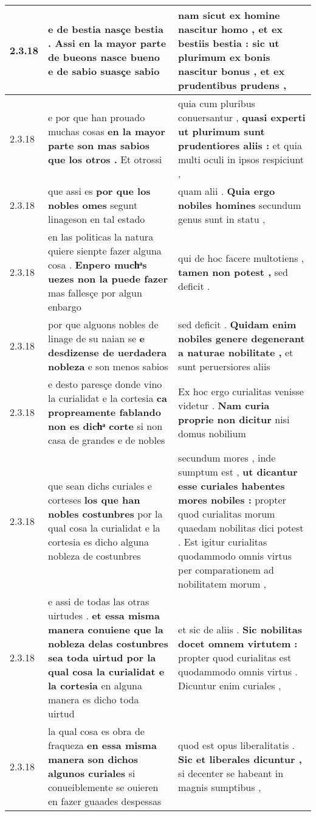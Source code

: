 \begin{tabular}{|p{1cm}|p{6.5cm}|p{6.5cm}|}
2.3.18 & e de bestia nasçe bestia . \textbf{ Assi en la mayor parte de bueons nasce bueno } e de sabio suasçe sabio & nam sicut ex homine nascitur homo , et ex bestiis bestia : \textbf{ sic ut plurimum ex bonis nascitur bonus , } et ex prudentibus prudens , \\\hline
2.3.18 & e por que han prouado muchas cosas \textbf{ en la mayor parte son mas sabios que los otros . } Et otrossi & quia cum pluribus conuersantur , \textbf{ quasi experti ut plurimum sunt prudentiores aliis : } et quia multi oculi in ipsos respiciunt , \\\hline
2.3.18 & que assi es \textbf{ por que los nobles omes } segunt linageson en tal estado & quam alii . \textbf{ Quia ergo nobiles homines } secundum genus sunt in statu , \\\hline
2.3.18 & en las politicas la natura quiere sienpte fazer alguna cosa . \textbf{ Enpero muchͣs uezes non la puede fazer } mas fallesçe por algun enbargo & qui de hoc facere multotiens , \textbf{ tamen non potest , } sed deficit . \\\hline
2.3.18 & por que alguons nobles de linage de su naian se \textbf{ e desdizense de uerdadera nobleza } e son menos sabios & sed deficit . \textbf{ Quidam enim nobiles genere degenerant a naturae nobilitate , } et sunt peruersiores aliis \\\hline
2.3.18 & e desto paresçe donde vino la curialidat e la cortesia \textbf{ ca propreamente fablando non es dichͣ corte } si non casa de grandes e de nobles & Ex hoc ergo curialitas venisse videtur . \textbf{ Nam curia proprie non dicitur } nisi domus nobilium \\\hline
2.3.18 & que sean dichs curiales e corteses \textbf{ los que han nobles costunbres } por la qual cosa la curialidat e la cortesia es dicho alguna nobleza de costunbres & secundum mores , inde sumptum est , \textbf{ ut dicantur esse curiales habentes mores nobiles : } propter quod curialitas morum quaedam nobilitas dici potest . Est igitur curialitas quodammodo omnis virtus per comparationem ad nobilitatem morum , \\\hline
2.3.18 & e assi de todas las otras uirtudes . \textbf{ et essa misma manera conuiene que la nobleza delas costunbres sea toda uirtud por la qual cosa la curialidat e la cortesia } en alguna manera es dicho toda uirtud & et sic de aliis . \textbf{ Sic nobilitas docet omnem virtutem : } propter quod curialitas est quodammodo omnis virtus . Dicuntur enim curiales , \\\hline
2.3.18 & la qual cosa es obra de fraqueza \textbf{ en essa misma manera son dichos algunos curiales } si conueiblemente se ouieren en fazer guaades despessas & quod est opus liberalitatis . \textbf{ Sic et liberales dicuntur , } si decenter se habeant in magnis sumptibus , \\\hline

\end{tabular}
